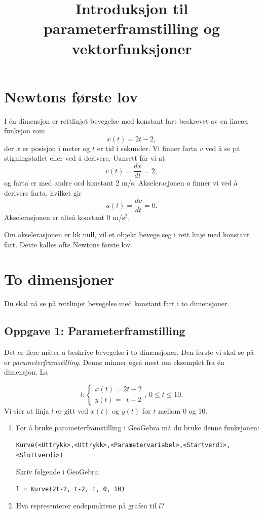 \documentclass[a4paper,12pt]{article}
\title{Introduksjon til parameterframstilling og vektorfunksjoner}
\author{}
\date{}
\begin{document}
\maketitle


\section*{Newtons første lov}

I én dimensjon er rettlinjet bevegelse med konstant fart beskrevet av en lineær funksjon som 
\[
x(t) = 2t-2,
\]
der $x$ er posisjon i meter og $t$ er tid i sekunder. Vi finner farta $v$ ved å se på stigningstallet eller ved å derivere. Uansett får vi at
\[
v(t) = \frac{dx}{dt} = 2,
\]
og farta er med andre ord konstant 2 m/s. Akselerasjonen $a$ finner vi ved å derivere farta, hvilket gir
\[
a(t) = \frac{dv}{dt} = 0.
\]
Akselerasjonen er altså konstant 0 m/s$^2$.

Om akselerasjonen er lik null, vil et objekt bevege seg i rett linje med konstant fart. Dette kalles ofte Newtons første lov.

\section*{To dimensjoner}

Du skal nå se på rettlinjet bevegelse med konstant fart i to dimensjoner.

\subsection*{Oppgave 1: Parameterframstilling}

Det er flere måter å beskrive bevegelse i to dimensjoner. Den første vi skal se på er \textit{parameterframstilling}. Denne minner også mest om eksemplet fra én dimensjon. La

\[
l:
\begin{cases}
x(t)=2t - 2 \\
y(t)=\phantom{2}t-2
\end{cases},\, 0 \leq t \leq 10.
\]
Vi sier at linja $l$ er gitt ved $x(t)$ og $y(t)$ for $t$ mellom 0 og 10.

\begin{enumerate}[label=\alph*)]
\item For å bruke parameterframstilling i GeoGebra må du bruke denne funksjonen:
\begin{lstlisting}
Kurve(<Uttrykk>,<Uttrykk>,<Parametervariabel>,<Startverdi>,<Sluttverdi>)
\end{lstlisting}
Skriv følgende i GeoGebra:
\begin{lstlisting}
l = Kurve(2t-2, t-2, t, 0, 10)
\end{lstlisting}

\item Hva representerer endepunktene på grafen til $l$?
\end{enumerate}
\end{document}
